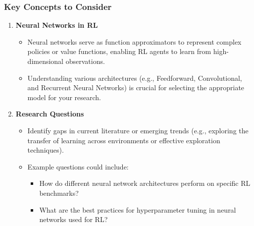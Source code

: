 \documentclass[aspectratio=169]{beamer}
\begin{document}
\begin{frame}[fragile]
    \frametitle{Key Concepts to Consider}
    \begin{enumerate}
        \item \textbf{Neural Networks in RL}
        \begin{itemize}
            \item Neural networks serve as function approximators to represent complex policies or value functions, enabling RL agents to learn from high-dimensional observations.
            \item Understanding various architectures (e.g., Feedforward, Convolutional, and Recurrent Neural Networks) is crucial for selecting the appropriate model for your research.
        \end{itemize}
        
        \item \textbf{Research Questions}
        \begin{itemize}
            \item Identify gaps in current literature or emerging trends (e.g., exploring the transfer of learning across environments or effective exploration techniques).
            \item Example questions could include:
            \begin{itemize}
                \item How do different neural network architectures perform on specific RL benchmarks?
                \item What are the best practices for hyperparameter tuning in neural networks used for RL?
            \end{itemize}
        \end{itemize}
    \end{enumerate}
\end{frame}
\end{document}

